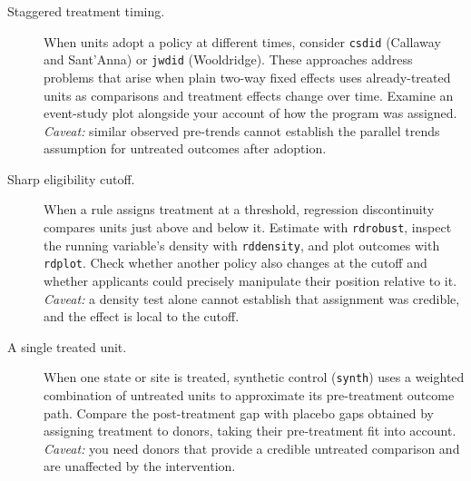 \documentclass[
    a4paper,
    fontsize=10pt,
    twoside=true,
    numbers=noenddot,
]{kaobook}
\begin{document}
\begin{description}
    \item[Staggered treatment timing.] When units adopt a policy at different times, consider \texttt{csdid} (Callaway and Sant'Anna) or \texttt{jwdid} (Wooldridge). These approaches address problems that arise when plain two-way fixed effects uses already-treated units as comparisons and treatment effects change over time. Examine an event-study plot alongside your account of how the program was assigned. \emph{Caveat:} similar observed pre-trends cannot establish the parallel trends assumption for untreated outcomes after adoption.
    \item[Sharp eligibility cutoff.] When a rule assigns treatment at a threshold, regression discontinuity compares units just above and below it. Estimate with \texttt{rdrobust}, inspect the running variable's density with \texttt{rddensity}, and plot outcomes with \texttt{rdplot}. Check whether another policy also changes at the cutoff and whether applicants could precisely manipulate their position relative to it. \emph{Caveat:} a density test alone cannot establish that assignment was credible, and the effect is local to the cutoff.
    \item[A single treated unit.] When one state or site is treated, synthetic control (\texttt{synth}) uses a weighted combination of untreated units to approximate its pre-treatment outcome path. Compare the post-treatment gap with placebo gaps obtained by assigning treatment to donors, taking their pre-treatment fit into account. \emph{Caveat:} you need donors that provide a credible untreated comparison and are unaffected by the intervention.

\end{description}
\end{document}
